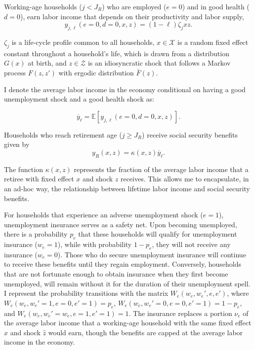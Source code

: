 \documentclass[parskip=full]{article}
\begin{document}
Working-age households ($j<J_R$) who are employed ($e=0$) and in good health ($d=0$), earn labor income that depends on their productivity and labor supply,
\begin{equation}
y_{j,\ell}(e=0,d=0,x,z) = (1-\ell) \zeta_j x z.
\end{equation}

\noindent $\zeta_j$ is a life-cycle profile common to all households, $x\in \mathcal{X}$ is a random fixed effect constant throughout a household's life, which is drawn from a distribution $G(x)$ at birth, and $z\in \mathcal{Z}$ is an idiosyncratic shock that follows a Markov process $F(z,z')$ with ergodic distribution $\bar{F}(z)$.

I denote the average labor income in the economy conditional on having a good unemployment shock and a good health shock as: 

\begin{equation}
    \overline{y}_{\ell}=\mathbb{E}[y_{j,\ell}(e=0,d=0,x,z)].
\end{equation} 

\noindent Households who reach retirement age ($j\geq J_R$) receive social security benefits given by
\begin{equation}
    y_R(x,z) = \kappa(x,z) \overline{y}_{\ell}.
\end{equation}

\noindent The function $\kappa(x,z)$ represents the fraction of the average labor income that a retiree with fixed effect $x$ and shock $z$ receives. This allows me to encapsulate, in an ad-hoc way, the relationship between lifetime labor income and social security benefits. 

For households that experience an adverse unemployment shock ($e=1$), unemployment insurance serves as a safety net. Upon becoming unemployed, there is a probability $p_{e}$ that these households will qualify for unemployment insurance ($w_{e}=1$), while with probability $1-p_{e}$, they will not receive any insurance ($w_{e}=0$). Those who do secure unemployment insurance will continue to receive these benefits until they regain employment. Conversely, households that are not fortunate enough to obtain insurance when they first become unemployed, will remain without it for the duration of their unemployment spell. I represent the probability transitions with the matrix $W_{e}(w_{e},w_{e}',e,e')$, where $W_{e}(w_{e},w_{e}'=1,e=0,e'=1)=p_{e}$, $W_{e}(w_{e},w_{e}'=0,e=0,e'=1)=1-p_{e}$, and $W_{e}(w_{e},w_{e}'=w_{e},e=1,e'=1)=1$. The insurance replaces a portion $\nu_{e}$ of the average labor income that a working-age household with the same fixed effect $\hat{x}$ and shock $\hat{z}$ would earn, though the benefits are capped at the average labor income in the economy.
\end{document}
